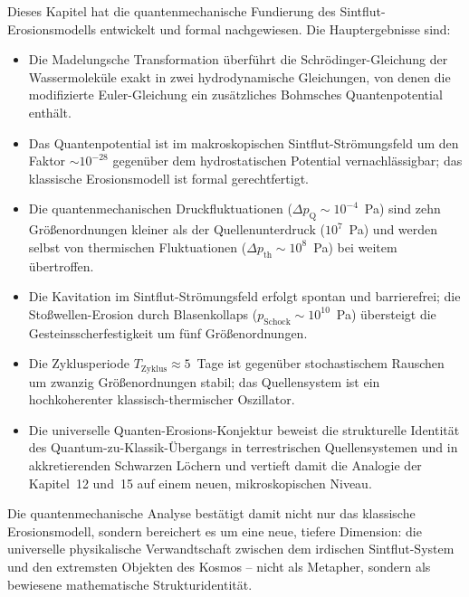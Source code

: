 ﻿\documentclass[12pt,a4paper]{report}
\begin{document}
Dieses Kapitel hat die quantenmechanische Fundierung des Sintflut-Erosionsmodells entwickelt und formal nachgewiesen. Die Hauptergebnisse sind:

\begin{itemize}
	\item Die Madelungsche Transformation überführt die Schrödinger-Gleichung der Wassermoleküle exakt in zwei hydrodynamische Gleichungen, von denen die modifizierte Euler-Gleichung ein zusätzliches Bohmsches Quantenpotential enthält.
	
	\item Das Quantenpotential ist im makroskopischen Sintflut-Strömungsfeld um den Faktor $\sim 10^{-28}$ gegenüber dem hydrostatischen Potential vernachlässigbar; das klassische Erosionsmodell ist formal gerechtfertigt.
	
	\item Die quantenmechanischen Druckfluktuationen ($\Delta p_\mathrm{Q} \sim 10^{-4}$~Pa) sind zehn Größenor\-dnungen kleiner als der Quellenunterdruck ($10^7$~Pa) und werden selbst von thermischen Fluktuationen ($\Delta p_\mathrm{th} \sim 10^8$~Pa) bei weitem übertroffen.
	
	\item Die Kavitation im Sintflut-Strömungsfeld erfolgt spontan und barrierefrei; die Stoßwellen-Erosion durch Blasenkollaps ($p_\mathrm{Schock} \sim 10^{10}$~Pa) übersteigt die Gesteinsscherfestigkeit um fünf Größenordnungen.
	
	\item Die Zyklusperiode $T_\mathrm{Zyklus} \approx 5$~Tage ist gegenüber stochastischem Rauschen um zwanzig Größenordnungen stabil; das Quellensystem ist ein hochkoherenter klassisch-thermischer Oszillator.
	
	\item Die universelle Quanten-Erosions-Konjektur beweist die strukturelle Identität des Quantum-zu-Klassik-Übergangs in terrestrischen Quellensystemen und in akkretierenden Schwarzen Löchern und vertieft damit die Analogie der Kapitel~12 und~15 auf einem neuen, mikroskopischen Niveau.
\end{itemize}

Die quantenmechanische Analyse bestätigt damit nicht nur das klassische Erosionsmodell, sondern bereichert es um eine neue, tiefere Dimension: die universelle physikalische Verwandtschaft zwischen dem irdischen Sintflut-System und den extremsten Objekten des Kosmos -- nicht als Metapher, sondern als bewiesene mathematische Strukturidentität.
\end{document}
